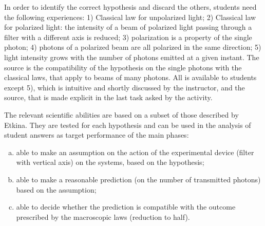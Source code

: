 \documentclass[twocolumn,secnumarabic,amssymb, nobibnotes, aps, prd, nofootinbib]{revtex4-2}
\begin{document}
In order to identify the correct hypothesis and discard the others, students need the following experiences: 1) Classical law for unpolarized light; 2) Classical law for polarized light: the intensity of a beam of polarized light passing through a filter with a different axis is reduced; 3)  polarization is a property of the single photon; 4) photons of a polarized beam are all polarized in the same direction;  5) light intensity grows with the number of photons emitted at a given instant. The source is the compatibility of the hypothesis on the single photons with the classical laws, that apply to beams of many photons. All is available to students except 5), which is intuitive and shortly discussed by the instructor, and the source, that is made explicit in the last task asked by the activity.

The relevant scientific abilities are based on a subset of those described by Etkina. They are tested for each hypothesis and can be used in the analysis of student answers as target performance of the main phases:
\begin{enumerate}[(a)]
    \item able to make an assumption on the action of the experimental device (filter with vertical axis) on the systems, based on the hypothesis;
    \item able to make a reasonable prediction (on the number of transmitted photons) based on the assumption;
    \item able to decide whether the prediction is compatible with the outcome prescribed by the macroscopic laws (reduction to half).
\end{enumerate}
\end{document}
